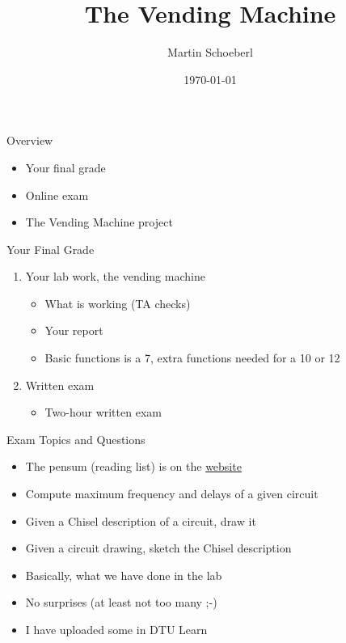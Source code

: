 

\newif\ifbook


\title{The Vending Machine}
\author{Martin Schoeberl}
\date{\today}



\begin{frame}
\titlepage
\end{frame}



\begin{frame}[fragile]{Overview}
\begin{itemize}
\item Your final grade
\item Online exam
\item The Vending Machine project
\end{itemize}
\end{frame}

\begin{frame}[fragile]{Your Final Grade}
\begin{enumerate}
\item Your lab work, the vending machine
\begin{itemize}
\item What is working (TA checks)
\item Your report
\item Basic functions is a 7, extra functions needed for a 10 or 12
\end{itemize}
\item Written exam
\begin{itemize}
\item Two-hour written exam
\end{itemize}
\end{enumerate}
\end{frame}

\begin{frame}[fragile]{Exam Topics and Questions}
\begin{itemize}
\item The pensum (reading list) is on the \href{http://www2.imm.dtu.dk/courses/02139/}{website}
\item Compute maximum frequency and delays of a given circuit
\item Given a Chisel description of a circuit, draw it
\item Given a circuit drawing, sketch the Chisel description
\item Basically, what we have done in the lab
\item No surprises (at least not too many ;-)
\item I have uploaded some in DTU Learn
\end{itemize}
\end{frame}



